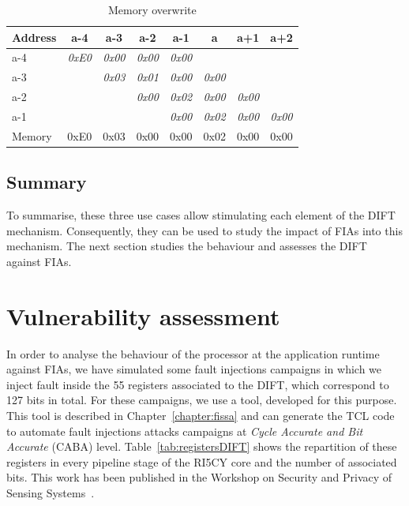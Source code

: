 \begin{table}[t]
    \centering
    \footnotesize
    \caption{Memory overwrite}
    \label{table:ftpdOverwriteMemory}
    \begin{tabular}{l|ccccccc}
        \toprule
        Address & a-4 & a-3 & a-2 & a-1 & a & a+1 & a+2 \\ \midrule
        a-4     & \textit{0xE0} & \textit{0x00} & \textit{0x00} & \textit{0x00} & \textit{}     & \textit{}     & \textit{}     \\
        a-3     & \textit{}     & \textit{0x03} & \textit{0x01} & \textit{0x00} & \textit{0x00} & \textit{}     & \textit{}     \\
        a-2     & \textit{}     & \textit{}     & \textit{0x00} & \textit{0x02} & \textit{0x00} & \textit{0x00} & \textit{}     \\
        a-1     & \textit{}     & \textit{}     & \textit{}     & \textit{0x00} & \textit{0x02} & \textit{0x00} & \textit{0x00} \\ \midrule
        Memory & {0xE0}    & {0x03}    & 0x00          & 0x00          & 0x02          & 0x00          & 0x00          \\
        \bottomrule
    \end{tabular}
\end{table}

\subsection{Summary}
To summarise, these three use cases allow stimulating each element of the DIFT mechanism. Consequently, they can be used to study the impact of FIAs into this mechanism. The next section studies the behaviour and assesses the DIFT against FIAs.

\section{Vulnerability assessment}
\label{section:vuln_assessment}
In order to analyse the behaviour of the processor at the application runtime against FIAs, we have simulated some fault injections campaigns in which we inject fault inside the 55 registers associated to the DIFT, which correspond to 127 bits in total. For these campaigns, we use a tool, developed for this purpose. This tool is described in Chapter~\ref{chapter:fissa} and can generate the TCL code to automate fault injections attacks campaigns at\textit{ Cycle Accurate and Bit Accurate} (CABA) level.
Table~\ref{tab:registersDIFT} shows the repartition of these registers in every pipeline stage of the RI5CY core and the number of associated bits. This work has been published in the Workshop on Security and Privacy of Sensing Systems~\cite{PLG-22-SensorsSP}.

